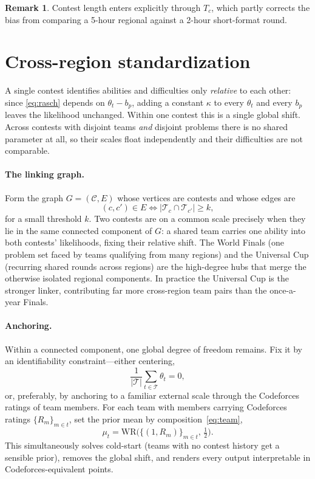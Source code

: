 \documentclass[11pt]{article}
\newcommand{\Teams}{\mathcal{T}}
\newcommand{\Conts}{\mathcal{C}}
\theoremstyle{definition}
\newtheorem{remark}{Remark}
\begin{document}
\begin{remark}
Contest length enters explicitly through $T_c$, which partly corrects the bias
from comparing a 5-hour regional against a 2-hour short-format round.
\end{remark}

\section{Cross-region standardization}\label{sec:link}

A single contest identifies abilities and difficulties only \emph{relative} to
each other: since \eqref{eq:rasch} depends on $\theta_t - b_p$, adding a constant
$\kappa$ to every $\theta_t$ and every $b_p$ leaves the likelihood unchanged.
Within one contest this is a single global shift. Across contests with disjoint
teams \emph{and} disjoint problems there is no shared parameter at all, so their
scales float independently and their difficulties are not comparable.

\paragraph{The linking graph.}
Form the graph $G=(\Conts, E)$ whose vertices are contests and whose edges are
\begin{equation}\label{eq:graph}
  (c,c') \in E \iff |\Teams_c \cap \Teams_{c'}| \ge k ,
\end{equation}
for a small threshold $k$. Two contests are on a common scale precisely when they
lie in the same connected component of $G$: a shared team carries one ability into
both contests' likelihoods, fixing their relative shift. The World Finals (one
problem set faced by teams qualifying from many regions) and the Universal Cup
(recurring shared rounds across regions) are the high-degree hubs that merge the
otherwise isolated regional components. In practice the Universal Cup is the
stronger linker, contributing far more cross-region team pairs than the
once-a-year Finals.

\paragraph{Anchoring.}
Within a connected component, one global degree of freedom remains. Fix it by an
identifiability constraint---either centering,
\begin{equation}\label{eq:center}
  \frac{1}{|\Teams|}\sum_{t\in\Teams}\theta_t = 0,
\end{equation}
or, preferably, by anchoring to a familiar external scale through the Codeforces
ratings of team members. For each team with members carrying Codeforces ratings
$\{R_m\}_{m\in t}$, set the prior mean by composition~\eqref{eq:team},
\begin{equation}\label{eq:cfprior}
  \mu_t = \mathrm{WR}\big(\{(1,R_m)\}_{m\in t},\, \tfrac12\big).
\end{equation}
This simultaneously solves cold-start (teams with no contest history get a
sensible prior), removes the global shift, and renders every output
interpretable in Codeforces-equivalent points.
\end{document}
